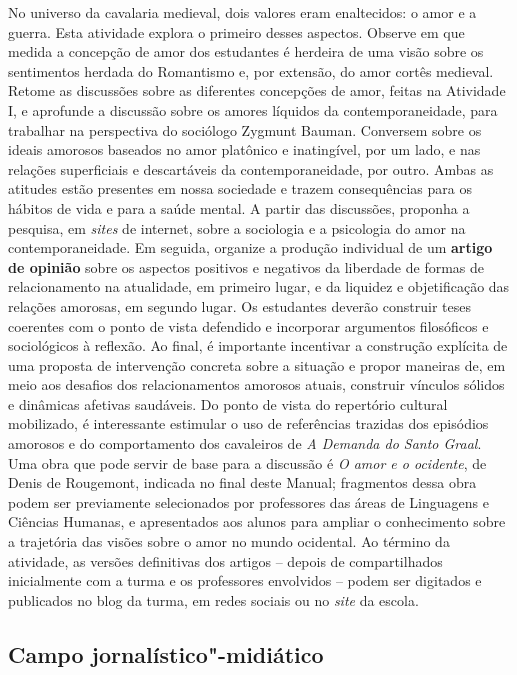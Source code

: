 \documentclass{extarticle}
\begin{document}
  No universo da cavalaria medieval, dois valores eram enaltecidos: o
  amor e a guerra. Esta atividade explora o primeiro desses aspectos.
  Observe em que medida a concepção de amor dos estudantes é herdeira de
  uma visão sobre os sentimentos herdada do Romantismo e, por extensão,
  do amor cortês medieval. Retome as discussões sobre as diferentes
  concepções de amor, feitas na Atividade I, e aprofunde a discussão
  sobre os amores líquidos da contemporaneidade, para trabalhar na
  perspectiva do sociólogo Zygmunt Bauman. Conversem sobre os ideais
  amorosos baseados no amor platônico e inatingível, por um lado, e nas
  relações superficiais e descartáveis da contemporaneidade, por outro.
  Ambas as atitudes estão presentes em nossa sociedade e trazem
  consequências para os hábitos de vida e para a saúde mental. A partir
  das discussões, proponha a pesquisa, em \emph{sites} de internet,
  sobre a sociologia e a psicologia do amor na contemporaneidade. Em
  seguida, organize a produção individual de um \textbf{artigo de
  opinião} sobre os aspectos positivos e negativos da liberdade de
  formas de relacionamento na atualidade, em primeiro lugar, e da
  liquidez e objetificação das relações amorosas, em segundo lugar. Os
  estudantes deverão construir teses coerentes com o ponto de vista
  defendido e incorporar argumentos filosóficos e sociológicos à
  reflexão. Ao final, é importante incentivar a construção explícita de
  uma proposta de intervenção concreta sobre a situação e propor
  maneiras de, em meio aos desafios dos relacionamentos amorosos atuais,
  construir vínculos sólidos e dinâmicas afetivas saudáveis. Do ponto de
  vista do repertório cultural mobilizado, é interessante estimular o
  uso de referências trazidas dos episódios amorosos e do comportamento
  dos cavaleiros de \emph{A Demanda do Santo Graal}. Uma obra que pode
  servir de base para a discussão é \emph{O amor e o ocidente}, de Denis
  de Rougemont, indicada no final deste Manual; fragmentos dessa obra
  podem ser previamente selecionados por professores das áreas de
  Linguagens e Ciências Humanas, e apresentados aos alunos para ampliar
  o conhecimento sobre a trajetória das visões sobre o amor no mundo
  ocidental. Ao término da atividade, as versões definitivas dos artigos
  -- depois de compartilhados inicialmente com a turma e os professores
  envolvidos -- podem ser digitados e publicados no blog da turma, em
  redes sociais ou no \emph{site} da escola.

\subsection{Campo jornalístico"-midiático }
\end{document}

